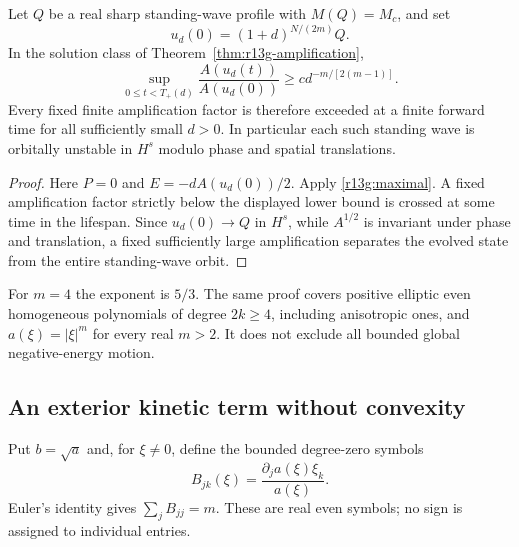 \begin{corollary}
\label{cor:r13g-ground-instability}
Let $Q$ be a real sharp standing-wave profile with $M(Q)=M_c$, and set
\[
 u_d(0)=(1+d)^{N/(2m)}Q.
\]
In the solution class of Theorem~\ref{thm:r13g-amplification},
\begin{equation}\label{r13g:ground-amplification}
 \sup_{0\le t<T_+(d)}
       \frac{A(u_d(t))}{A(u_d(0))}
 \ge c d^{-m/[2(m-1)]}.
\end{equation}
Every fixed finite amplification factor is therefore exceeded at a
finite forward time for all sufficiently small $d>0$. In particular
each such standing wave is orbitally unstable in $H^s$ modulo phase
and spatial translations.
\end{corollary}
\begin{proof}
Here $P=0$ and $E=-dA(u_d(0))/2$. Apply
\eqref{r13g:maximal}. A fixed amplification factor strictly below
the displayed lower bound is crossed at some time in the lifespan.
Since $u_d(0)\to Q$ in $H^s$, while $A^{1/2}$ is invariant under
phase and translation, a fixed sufficiently large amplification
separates the evolved state from the entire standing-wave orbit.
\end{proof}

For $m=4$ the exponent is $5/3$. The same proof covers positive
elliptic even homogeneous polynomials of degree $2k\ge4$, including
anisotropic ones, and $a(\xi)=|\xi|^m$ for every real $m>2$.
It does not exclude all bounded global negative-energy motion.

\subsection{An exterior kinetic term without convexity}

Put $b=\sqrt a$ and, for $\xi\ne0$, define the bounded degree-zero
symbols
\[
 B_{jk}(\xi)=\frac{\partial_j a(\xi)\xi_k}{a(\xi)}.
\]
Euler's identity gives $\sum_jB_{jj}=m$. These are real even symbols;
no sign is assigned to individual entries.

